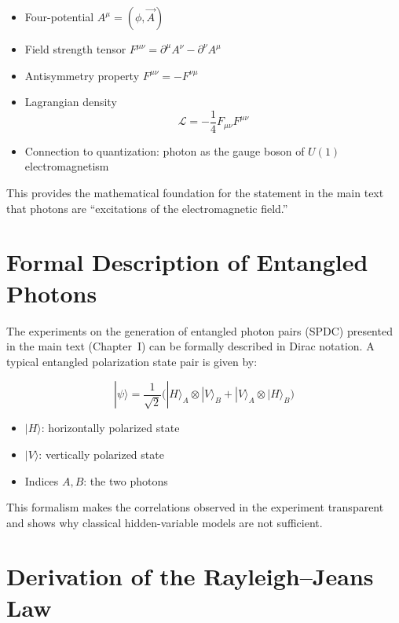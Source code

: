 \begin{itemize}
	\item Four-potential $A^\mu = (\phi, \vec{A})$
	\item Field strength tensor $F^{\mu\nu} = \partial^\mu A^\nu - \partial^\nu A^\mu$
	\item Antisymmetry property $F^{\mu\nu} = -F^{\nu\mu}$
	\item Lagrangian density
	\[
	\mathcal{L} = -\frac{1}{4} F_{\mu\nu}F^{\mu\nu}
	\]
	\item Connection to quantization: photon as the gauge boson of $U(1)$
	electromagnetism
\end{itemize}

This provides the mathematical foundation for the statement in the main text
that photons are “excitations of the electromagnetic field.”

\section{Formal Description of Entangled Photons}
\label{anhangA:verschr}

The experiments on the generation of entangled photon pairs (SPDC) presented
in the main text (Chapter~I) can be formally described in Dirac notation. A
typical entangled polarization state pair is given by:

\[
|\psi\rangle = \frac{1}{\sqrt{2}}\big( |H\rangle_A \otimes |V\rangle_B +
|V\rangle_A \otimes |H\rangle_B \big)
\]

\begin{itemize}
	\item $|H\rangle$: horizontally polarized state
	\item $|V\rangle$: vertically polarized state
	\item Indices $A, B$: the two photons
\end{itemize}

This formalism makes the correlations observed in the experiment transparent
and shows why classical hidden-variable models are not sufficient.
\section{Derivation of the Rayleigh–Jeans Law}
\label{anhangA:rayleigh}

